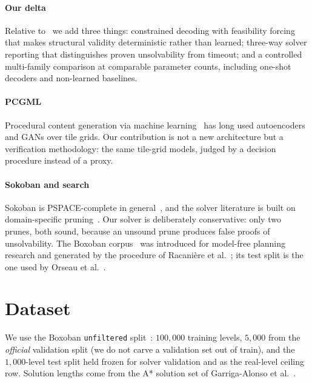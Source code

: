 \documentclass[conference]{IEEEtran}
\begin{document}
\paragraph{Our delta}
Relative to~\cite{todd2023level} we add three things: constrained decoding with
feasibility forcing that makes structural validity deterministic rather than
learned; three-way solver reporting that distinguishes proven unsolvability from
timeout; and a controlled multi-family comparison at comparable parameter
counts, including one-shot decoders and non-learned baselines.

\paragraph{PCGML}
Procedural content generation via machine learning~\cite{summerville2018pcgml}
has long used autoencoders and GANs over tile grids. Our contribution is not a
new architecture but a verification methodology: the same tile-grid models,
judged by a decision procedure instead of a proxy.

\paragraph{Sokoban and search}
Sokoban is PSPACE-complete in general~\cite{culberson1997sokoban}, and the
solver literature is built on domain-specific pruning~\cite{junghanns2001sokoban}.
Our solver is deliberately conservative: only two prunes, both sound, because an
unsound prune produces false proofs of unsolvability. The Boxoban
corpus~\cite{boxobanlevels} was introduced for model-free planning research and
generated by the procedure of Racani\`ere et al.~\cite{racaniere2017imagination};
its test split is the one used by Orseau et al.~\cite{orseau2018single}.

\section{Dataset}
\label{sec:dataset}

We use the Boxoban \texttt{unfiltered} split~\cite{boxobanlevels}: $100{,}000$
training levels, $5{,}000$ from the \emph{official} validation split (we do not
carve a validation set out of train), and the $1{,}000$-level test split held
frozen for solver validation and as the real-level ceiling row. Solution lengths
come from the A* solution set of Garriga-Alonso et
al.~\cite{garrigaalonso2024planning}.
\end{document}
